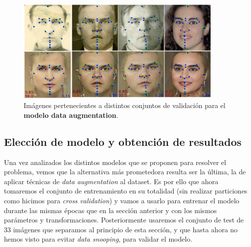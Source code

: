         \begin{figure}[!h]
            \centering
            \includegraphics[width=0.9\textwidth]{img/image_daug.png}
            \caption{Imágenes pertenecientes a distintos conjuntos de validación para el \textbf{modelo data augmentation}.}
            \label{fig:Ejemplo_daug}
        \end{figure}

    \subsection{Elección de modelo y obtención de resultados}

        \noindent Una vez analizados los distintos modelos que se proponen para resolver el problema, vemos que la alternativa más prometedora resulta ser la última, la de aplicar técnicas de \textit{data augmentation} al dataset. Es por ello que ahora tomaremos el conjunto de entrenamiento en su totalidad (sin realizar particiones como hicimos para \textit{cross validation}) y vamos a usarlo para entrenar el modelo durante las mismas épocas que en la sección anterior y con los mismos parámetros y transformaciones. Posteriormente usaremos el conjunto de test de $33$ imágenes que separamos al principio de esta sección, y que hasta ahora no hemos visto para evitar \textit{data snooping}, para validar el modelo.

